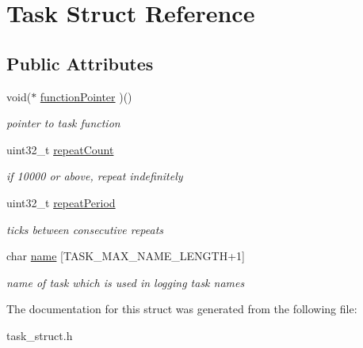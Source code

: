 \hypertarget{struct_task}{}\section{Task Struct Reference}
\label{struct_task}
\subsection*{Public Attributes}
\begin{DoxyCompactItemize}
\item 
\mbox{\label{struct_task_a9423ef819273dbdf0c3beb60eecd60c4}} 
void($\ast$ \mbox{\hyperlink{struct_task_a9423ef819273dbdf0c3beb60eecd60c4}{function\+Pointer}} )()
\begin{DoxyCompactList}\small\item\em pointer to task function \end{DoxyCompactList}\item 
\mbox{\label{struct_task_afa1c1d32dcfdb14d56e2a63ce4ec213e}} 
uint32\+\_\+t \mbox{\hyperlink{struct_task_afa1c1d32dcfdb14d56e2a63ce4ec213e}{repeat\+Count}}
\begin{DoxyCompactList}\small\item\em if 10000 or above, repeat indefinitely \end{DoxyCompactList}\item 
\mbox{\label{struct_task_a4794f174bb29a1749f7e9346f6746957}} 
uint32\+\_\+t \mbox{\hyperlink{struct_task_a4794f174bb29a1749f7e9346f6746957}{repeat\+Period}}
\begin{DoxyCompactList}\small\item\em ticks between consecutive repeats \end{DoxyCompactList}\item 
\mbox{\label{struct_task_a6e42b3db084bfde8bd82e7fa3da0896c}} 
char \mbox{\hyperlink{struct_task_a6e42b3db084bfde8bd82e7fa3da0896c}{name}} \mbox{[}T\+A\+S\+K\+\_\+\+M\+A\+X\+\_\+\+N\+A\+M\+E\+\_\+\+L\+E\+N\+G\+TH+1\mbox{]}
\begin{DoxyCompactList}\small\item\em name of task which is used in logging task names \end{DoxyCompactList}\end{DoxyCompactItemize}


The documentation for this struct was generated from the following file\+:\begin{DoxyCompactItemize}
\item 
task\+\_\+struct.\+h\end{DoxyCompactItemize}

